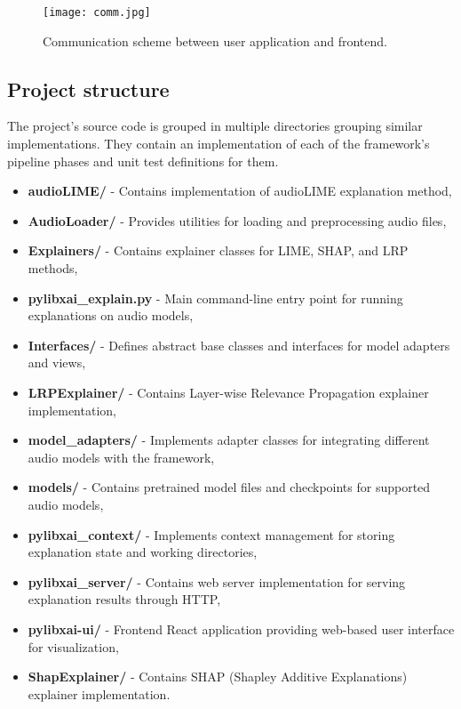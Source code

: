 \documentclass[
    bindingoffset=5mm,  %
    footnoteindent=3mm, %
    hyphenation=true    %
]{src/wut-thesis}
\begin{document}
\begin{figure}[h!] %
    \centering
    \texttt{[image: comm.jpg]}
    \caption{Communication scheme between user application and frontend.}
    \label{fig:CommunicationArchitecture}
\end{figure}

\subsection{Project structure}

    The project’s source code is grouped in multiple directories grouping similar implementations. They contain an implementation of each of the framework’s pipeline phases
    and unit test definitions for them.

\begin{itemize}[itemsep=1\baselineskip]
	\item \textbf{audioLIME/} - Contains implementation of audioLIME explanation method,
	\item \textbf{AudioLoader/} - Provides utilities for loading and preprocessing audio files,
	\item \textbf{Explainers/} - Contains explainer classes for LIME, SHAP, and LRP methods,
	\item \textbf{pylibxai\_explain.py} - Main command-line entry point for running explanations on audio models,
	\item \textbf{Interfaces/} - Defines abstract base classes and interfaces for model adapters and views,
	\item \textbf{LRPExplainer/} - Contains Layer-wise Relevance Propagation  explainer implementation,
	\item \textbf{model\_adapters/} - Implements adapter classes for integrating different audio models with the framework,
	\item \textbf{models/} - Contains pretrained model files and checkpoints for supported audio models,
	\item \textbf{pylibxai\_context/} - Implements context management for storing explanation state and working directories,
	\item \textbf{pylibxai\_server/} - Contains web server implementation for serving explanation results through HTTP,
	\item \textbf{pylibxai-ui/} - Frontend React application providing web-based user interface for visualization,
	\item \textbf{ShapExplainer/} - Contains SHAP (Shapley Additive Explanations) explainer implementation.
\end{itemize}
\end{document}
